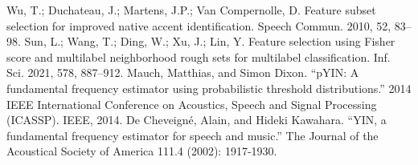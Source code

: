 \documentclass[ams]{U-AizuGT}
\begin{document}
\begin{thebibliography}{}
Wu, T.; Duchateau, J.; Martens, J.P.; Van Compernolle, D. Feature subset selection for improved native accent identification. Speech Commun. 2010, 52, 83–98.
Sun, L.; Wang, T.; Ding, W.; Xu, J.; Lin, Y. Feature selection using Fisher score and multilabel neighborhood rough sets for multilabel classification. Inf. Sci. 2021, 578, 887–912.
Mauch, Matthias, and Simon Dixon. “pYIN: A fundamental frequency estimator using probabilistic threshold distributions.” 2014 IEEE International Conference on Acoustics, Speech and Signal Processing (ICASSP). IEEE, 2014.
De Cheveigné, Alain, and Hideki Kawahara. “YIN, a fundamental frequency estimator for speech and music.” The Journal of the Acoustical Society of America 111.4 (2002): 1917-1930.

\end{thebibliography}
\end{document}
